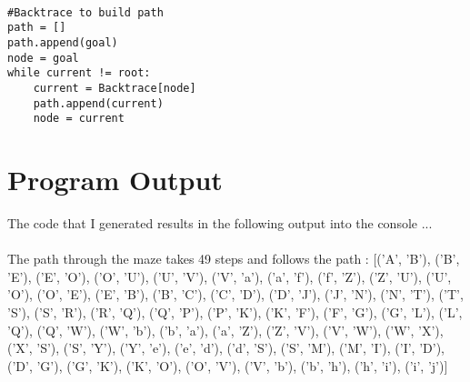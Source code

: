 \documentclass[11pt]{article}
\begin{document}
\begin{lstlisting}[caption=Traceback]

#Backtrace to build path
path = []
path.append(goal)
node = goal
while current != root:
    current = Backtrace[node]
    path.append(current)
    node = current

\end{lstlisting}

\newpage

\section{Program Output}
The code that I generated results in the following output into the console ... \\\\
The path through the maze takes 49 steps and follows the path : 
[('A', 'B'), ('B', 'E'), ('E', 'O'), ('O', 'U'), ('U', 'V'), ('V', 'a'), ('a', 'f'), ('f', 'Z'), ('Z', 'U'), ('U', 'O'), ('O', 'E'), ('E', 'B'), ('B', 'C'), ('C', 'D'), ('D', 'J'), ('J', 'N'), ('N', 'T'), ('T', 'S'), ('S', 'R'), ('R', 'Q'), ('Q', 'P'), ('P', 'K'), ('K', 'F'), ('F', 'G'), ('G', 'L'), ('L', 'Q'), ('Q', 'W'), ('W', 'b'), ('b', 'a'), ('a', 'Z'), ('Z', 'V'), ('V', 'W'), ('W', 'X'), ('X', 'S'), ('S', 'Y'), ('Y', 'e'), ('e', 'd'), ('d', 'S'), ('S', 'M'), ('M', 'I'), ('I', 'D'), ('D', 'G'), ('G', 'K'), ('K', 'O'), ('O', 'V'), ('V', 'b'), ('b', 'h'), ('h', 'i'), ('i', 'j')] \\
\end{document}
